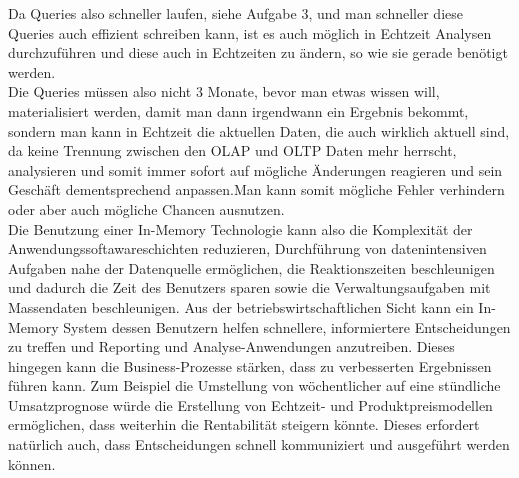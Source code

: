 Da Queries also schneller laufen, siehe Aufgabe 3, und man schneller diese Queries auch effizient schreiben kann, ist es auch möglich in Echtzeit Analysen durchzuführen und diese auch in Echtzeiten zu ändern, so wie sie gerade benötigt werden.
\\
Die Queries müssen also nicht 3 Monate, bevor man etwas wissen will, materialisiert werden, damit man dann irgendwann ein Ergebnis bekommt, sondern man kann in Echtzeit die aktuellen Daten, die auch wirklich aktuell sind, da keine Trennung zwischen den OLAP und OLTP Daten mehr herrscht, analysieren und somit immer sofort auf mögliche Änderungen reagieren und sein Geschäft dementsprechend anpassen.Man kann somit mögliche Fehler verhindern oder aber auch mögliche Chancen ausnutzen. 
\\
Die Benutzung einer In-Memory Technologie kann also die Komplexität der Anwendungssoftawareschichten reduzieren, Durchführung von datenintensiven Aufgaben nahe der Datenquelle ermöglichen, die Reaktionszeiten beschleunigen und dadurch die Zeit des Benutzers sparen sowie die Verwaltungsaufgaben mit Massendaten beschleunigen.
Aus der betriebswirtschaftlichen Sicht kann ein In-Memory System dessen Benutzern helfen schnellere, informiertere Entscheidungen zu treffen und Reporting und Analyse-Anwendungen anzutreiben. Dieses hingegen kann die Business-Prozesse stärken, dass zu verbesserten Ergebnissen führen kann. Zum Beispiel die Umstellung von wöchentlicher auf eine stündliche Umsatzprognose würde die Erstellung von Echtzeit- und Produktpreismodellen ermöglichen, dass weiterhin die Rentabilität steigern könnte. Dieses erfordert natürlich auch, dass Entscheidungen schnell kommuniziert und ausgeführt werden können.
\cite{In-memory}
